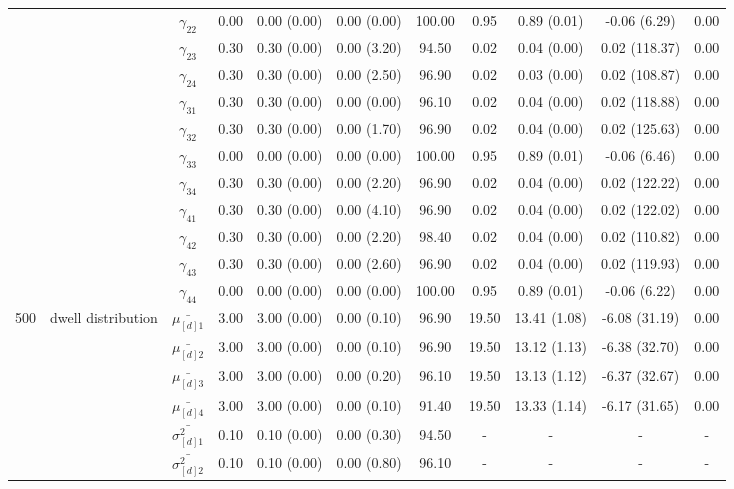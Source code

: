 \begin{table}[h]
{\begin{tabular}{ccccccccccc}
 &  & $\gamma_{22}$ & 0.00 & 0.00 (0.00) & 0.00 (0.00) & 100.00 & 0.95 & 0.89 (0.01) & -0.06 (6.29) & 0.00 \\
 &  & $\gamma_{23}$ & 0.30 & 0.30 (0.00) & 0.00 (3.20) & 94.50 & 0.02 & 0.04 (0.00) & 0.02 (118.37) & 0.00 \\
 &  & $\gamma_{24}$ & 0.30 & 0.30 (0.00) & 0.00 (2.50) & 96.90 & 0.02 & 0.03 (0.00) & 0.02 (108.87) & 0.00 \\
 &  & $\gamma_{31}$ & 0.30 & 0.30 (0.00) & 0.00 (0.00) & 96.10 & 0.02 & 0.04 (0.00) & 0.02 (118.88) & 0.00 \\
 &  & $\gamma_{32}$ & 0.30 & 0.30 (0.00) & 0.00 (1.70) & 96.90 & 0.02 & 0.04 (0.00) & 0.02 (125.63) & 0.00 \\
 &  & $\gamma_{33}$ & 0.00 & 0.00 (0.00) & 0.00 (0.00) & 100.00 & 0.95 & 0.89 (0.01) & -0.06 (6.46) & 0.00 \\
 &  & $\gamma_{34}$ & 0.30 & 0.30 (0.00) & 0.00 (2.20) & 96.90 & 0.02 & 0.04 (0.00) & 0.02 (122.22) & 0.00 \\
 &  & $\gamma_{41}$ & 0.30 & 0.30 (0.00) & 0.00 (4.10) & 96.90 & 0.02 & 0.04 (0.00) & 0.02 (122.02) & 0.00 \\
 &  & $\gamma_{42}$ & 0.30 & 0.30 (0.00) & 0.00 (2.20) & 98.40 & 0.02 & 0.04 (0.00) & 0.02 (110.82) & 0.00 \\
 &  & $\gamma_{43}$ & 0.30 & 0.30 (0.00) & 0.00 (2.60) & 96.90 & 0.02 & 0.04 (0.00) & 0.02 (119.93) & 0.00 \\
 &  & $\gamma_{44}$ & 0.00 & 0.00 (0.00) & 0.00 (0.00) & 100.00 & 0.95 & 0.89 (0.01) & -0.06 (6.22) & 0.00 \\ \midrule
500 & dwell distribution & $\bar{\mu_{[d]1}}$ & 3.00 & 3.00 (0.00) & 0.00 (0.10) & 96.90 & 19.50 & 13.41 (1.08) & -6.08 (31.19) & 0.00 \\
\multirow{39}{*}{} & \multirow{7}{*}{} & $\bar{\mu_{[d]2}}$ & 3.00 & 3.00 (0.00) & 0.00 (0.10) & 96.90 & 19.50 & 13.12 (1.13) & -6.38 (32.70) & 0.00 \\
 &  & $\bar{\mu_{[d]3}}$ & 3.00 & 3.00 (0.00) & 0.00 (0.20) & 96.10 & 19.50 & 13.13 (1.12) & -6.37 (32.67) & 0.00 \\
 &  & $\bar{\mu_{[d]4}}$ & 3.00 & 3.00 (0.00) & 0.00 (0.10) & 91.40 & 19.50 & 13.33 (1.14) & -6.17 (31.65) & 0.00 \\
 &  & $\bar{\sigma^2_{[d]1}}$ & 0.10 & 0.10 (0.00) & 0.00 (0.30) & 94.50 & - & - & - & - \\
 &  & $\bar{\sigma^2_{[d]2}}$ & 0.10 & 0.10 (0.00) & 0.00 (0.80) & 96.10 & - & - & - & - \\

\end{tabular}}
\end{table}
